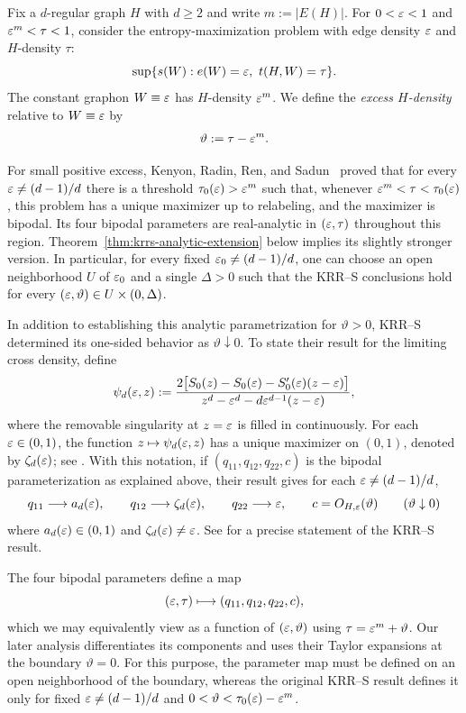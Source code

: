 Fix a $d$-regular graph $H$ with $d\ge2$ and write
$m:=|E(H)|$.  For $0<\varepsilon<1$ and $\varepsilon^m<\tau<1$, consider the
entropy-maximization problem with edge density $\varepsilon$ and $H$-density $\tau$:
\begin{equation}\label{eq:entropy-maximization-problem}
  \sup\{s(W):e(W)=\varepsilon,\ t(H,W)=\tau\}.
\end{equation}
The constant graphon $W\equiv\varepsilon$ has $H$-density $\varepsilon^m$.
We define the \emph{excess $H$-density} relative to $W\equiv\varepsilon$ by
\[
  \vartheta:=\tau-\varepsilon^m.
\]

For small positive excess, Kenyon, Radin, Ren,
and Sadun~\cite[Theorem~1.1]{kenyon2014entropy} proved
that for every $\varepsilon\ne(d-1)/d$ there is a threshold
$\tau_0(\varepsilon)>\varepsilon^m$ such that, whenever
$\varepsilon^m<\tau<\tau_0(\varepsilon)$, this problem has a unique maximizer up to
relabeling, and the maximizer is bipodal.  Its four bipodal parameters are
real-analytic in $(\varepsilon,\tau)$ throughout this region.
Theorem~\ref{thm:krrs-analytic-extension} below implies its slightly stronger
version. In particular, for every fixed $\varepsilon_0\ne(d-1)/d$,
one can choose an open neighborhood $U$ of $\varepsilon_0$ and a
single $\Delta>0$ such that the KRR--S conclusions hold for every
$(\varepsilon,\vartheta)\in U\times(0,\Delta)$.

In addition to establishing this analytic parametrization for
$\vartheta>0$, KRR--S determined its one-sided behavior as
$\vartheta\downarrow0$.  To state their result for the limiting cross density,
define
\[
  \psi_d(\varepsilon,z):=
  \frac{2\bigl[S_0(z)-S_0(\varepsilon)-S_0'(\varepsilon)(z-\varepsilon)\bigr]}
       {z^d-\varepsilon^d-d\varepsilon^{d-1}(z-\varepsilon)},
\]
where the removable singularity at $z=\varepsilon$ is filled in continuously.  For
each $\varepsilon\in(0,1)$, the function $z\mapsto\psi_d(\varepsilon,z)$ has a unique
maximizer on $(0,1)$, denoted by $\zeta_d(\varepsilon)$; see
\cite[Theorem~3.3 and Section~4]{kenyon2014entropy}.  With this notation,
if $(q_{11},q_{12},q_{22},c)$ is the bipodal
parameterization as explained above, their result gives for each $\varepsilon\ne(d-1)/d$,
\[
  q_{11}\longrightarrow a_d(\varepsilon),
  \qquad
  q_{12}\longrightarrow\zeta_d(\varepsilon),
  \qquad
  q_{22}\longrightarrow\varepsilon,
  \qquad
  c=O_{H,\varepsilon}(\vartheta)
  \qquad(\vartheta\downarrow0)
\]
where $a_d(\varepsilon) \in (0,1)$ and $\zeta_d(\varepsilon)\ne\varepsilon$.
See  for a precise statement of the KRR--S result.
  
The four bipodal parameters define a map
\[
  (\varepsilon,\tau)\longmapsto(q_{11},q_{12},q_{22},c),
\]
which we may equivalently view as a function of $(\varepsilon,\vartheta)$ using
$\tau=\varepsilon^m+\vartheta$.  Our later analysis differentiates its components and
uses their Taylor expansions at the boundary $\vartheta=0$.  For this
purpose, the parameter map must be defined on an open neighborhood of the
boundary, whereas the original KRR--S result defines it only for fixed $\varepsilon\ne(d-1)/d$ and
$0<\vartheta<\tau_0(\varepsilon)-\varepsilon^m$.

